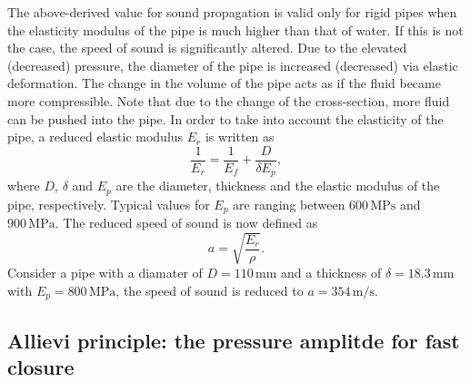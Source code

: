 The above-derived value for sound propagation is valid only for rigid pipes when the elasticity modulus of the pipe is much higher than that of water. If this is not the case, the speed of sound is significantly altered. Due to the elevated (decreased) pressure, the diameter of the pipe is increased (decreased) via elastic deformation. The change in the volume of the pipe acts as if the fluid became more compressible. Note that due to the change of the cross-section, more fluid can be pushed into the pipe. In order to take into account the elasticity of the pipe, a reduced elastic modulus $E_r$ is written as
%
\begin{equation}
\frac{1}{E_r} = \frac{1}{E_f} + \frac{D}{\delta E_p},
\end{equation}
%
where $D$, $\delta$ and $E_p$ are the diameter, thickness and the elastic modulus of the pipe, respectively. Typical values for $E_p$ are ranging between $600\,\mathrm{MPs}$ and $900\,\mathrm{MPa}$. The reduced speed of sound is now defined as
%
\begin{equation}
a = \sqrt{ \frac{E_r}{\rho} }.
\end{equation}
%
Consider a pipe with a diamater of $D=110\,\mathrm{mm}$ and a thickness of $\delta=18.3\,\mathrm{mm}$ with $E_p=800\,\mathrm{MPa}$, the speed of sound is reduced to $a=354\,\mathrm{m/s}$.

\subsection{Allievi principle: the pressure amplitde for fast closure} \label{sec:pressure_amplitude_fast_closure}

